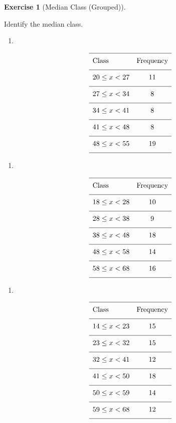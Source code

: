 \documentclass[
  letterpaper,
  DIV=11,
  numbers=noendperiod]{scrreprt}
\providecommand{\tightlist}{%
  \setlength{\itemsep}{0pt}\setlength{\parskip}{0pt}}
\theoremstyle{definition}
\newtheorem{exercise}{Exercise}[chapter]
\theoremstyle{remark}
\begin{document}
\begin{exercise}[Median Class
(Grouped)]\protect\hypertarget{exr-grp-3}{}\label{exr-grp-3}

Identify the median class.

\begin{enumerate}
\def\labelenumi{\alph{enumi})}
\tightlist
\item
\end{enumerate}

\[{\renewcommand{\arraystretch}{1.6}\begin{array}{lc}
\hline \text{Class} & \text{Frequency} \\[4pt]
\hline 20 \leq x < 27  & 11 \\[4pt]
\hline 27 \leq x < 34  & 8 \\[4pt]
\hline 34 \leq x < 41  & 8 \\[4pt]
\hline 41 \leq x < 48  & 8 \\[4pt]
\hline 48 \leq x < 55  & 19 \\[4pt]
\hline \end{array}}\]

\begin{enumerate}
\def\labelenumi{\alph{enumi})}
\setcounter{enumi}{1}
\tightlist
\item
\end{enumerate}

\[{\renewcommand{\arraystretch}{1.6}\begin{array}{lc}
\hline \text{Class} & \text{Frequency} \\[4pt]
\hline 18 \leq x < 28  & 10 \\[4pt]
\hline 28 \leq x < 38  & 9 \\[4pt]
\hline 38 \leq x < 48  & 18 \\[4pt]
\hline 48 \leq x < 58  & 14 \\[4pt]
\hline 58 \leq x < 68  & 16 \\[4pt]
\hline \end{array}}\]

\begin{enumerate}
\def\labelenumi{\alph{enumi})}
\setcounter{enumi}{2}
\tightlist
\item
\end{enumerate}

\[{\renewcommand{\arraystretch}{1.6}\begin{array}{lc}
\hline \text{Class} & \text{Frequency} \\[4pt]
\hline 14 \leq x < 23  & 15 \\[4pt]
\hline 23 \leq x < 32  & 15 \\[4pt]
\hline 32 \leq x < 41  & 12 \\[4pt]
\hline 41 \leq x < 50  & 18 \\[4pt]
\hline 50 \leq x < 59  & 14 \\[4pt]
\hline 59 \leq x < 68  & 12 \\[4pt]
\hline \end{array}}\]


\end{exercise}
\end{document}
